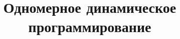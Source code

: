 \documentclass[14pt]{article}
\begin{document}
\title{Одномерное динамическое программирование}

\maketitle




\end{document}
